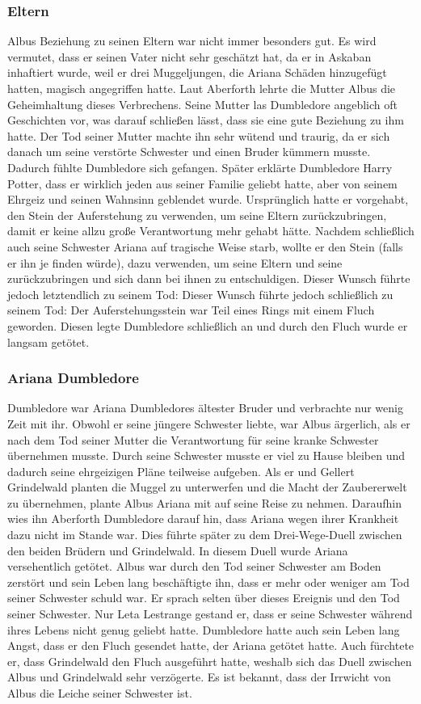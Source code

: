 \documentclass[a4paper, 10pt]{article}
\begin{document}
\subsubsection*{Eltern}
Albus Beziehung zu seinen Eltern war nicht immer besonders gut. Es wird vermutet, dass er seinen Vater nicht sehr geschätzt hat, da er in Askaban inhaftiert wurde, weil er drei Muggeljungen, die Ariana Schäden hinzugefügt hatten, magisch angegriffen hatte. Laut Aberforth lehrte die Mutter Albus die Geheimhaltung dieses Verbrechens. Seine Mutter las Dumbledore angeblich oft Geschichten vor, was darauf schließen lässt, dass sie eine gute Beziehung zu ihm hatte. Der Tod seiner Mutter machte ihn sehr wütend und traurig, da er sich danach um seine verstörte Schwester und einen Bruder kümmern musste. Dadurch fühlte Dumbledore sich gefangen.
\vspace{10pt}
\newline
Später erklärte Dumbledore Harry Potter, dass er wirklich jeden aus seiner Familie geliebt hatte, aber von seinem Ehrgeiz und seinen Wahnsinn geblendet wurde. Ursprünglich hatte er vorgehabt, den Stein der Auferstehung zu verwenden, um seine Eltern zurückzubringen, damit er keine allzu große Verantwortung mehr gehabt hätte. Nachdem schließlich auch seine Schwester Ariana auf tragische Weise starb, wollte er den Stein (falls er ihn je finden würde), dazu verwenden, um seine Eltern und seine zurückzubringen und sich dann bei ihnen zu entschuldigen. Dieser Wunsch führte jedoch letztendlich zu seinem Tod: Dieser Wunsch führte jedoch schließlich zu seinem Tod: Der Auferstehungsstein war Teil eines Rings mit einem Fluch geworden. Diesen legte Dumbledore schließlich an und durch den Fluch wurde er langsam getötet.
\subsubsection*{Ariana Dumbledore}
Dumbledore war Ariana Dumbledores ältester Bruder und verbrachte nur wenig Zeit mit ihr. Obwohl er seine jüngere Schwester liebte, war Albus ärgerlich, als er nach dem Tod seiner Mutter die Verantwortung für seine kranke Schwester übernehmen musste. Durch seine Schwester musste er viel zu Hause bleiben und dadurch seine ehrgeizigen Pläne teilweise aufgeben. Als er und Gellert Grindelwald planten die Muggel zu unterwerfen und die Macht der Zaubererwelt zu übernehmen, plante Albus Ariana mit auf seine Reise zu nehmen. Daraufhin wies ihn Aberforth Dumbledore darauf hin, dass Ariana wegen ihrer Krankheit dazu nicht im Stande war. Dies führte später zu dem Drei-Wege-Duell zwischen den beiden Brüdern und Grindelwald. In diesem Duell wurde Ariana versehentlich getötet. Albus war durch den Tod seiner Schwester am Boden zerstört und sein Leben lang beschäftigte ihn, dass er mehr oder weniger am Tod seiner Schwester schuld war. Er sprach selten über dieses Ereignis und den Tod seiner Schwester. Nur Leta Lestrange gestand er, dass er seine Schwester während ihres Lebens nicht genug geliebt hatte. Dumbledore hatte auch sein Leben lang Angst, dass er den Fluch gesendet hatte, der Ariana getötet hatte. Auch fürchtete er,
dass Grindelwald den Fluch ausgeführt hatte, weshalb sich das Duell zwischen Albus und Grindelwald sehr verzögerte. Es ist bekannt, dass der Irrwicht von Albus die Leiche seiner Schwester ist.
\end{document}
